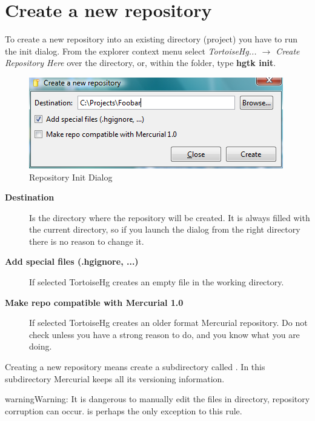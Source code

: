 \documentclass[letterpaper,10pt,english]{manual}
\begin{document}
\section{Create a new repository}
\hypertarget{module-init.dialog}{}
To create a new repository into an existing directory (project) you
have to run the init dialog. From the explorer context menu select
\emph{TortoiseHg... \(\rightarrow\) Create Repository Here} over the directory, or, within
the folder, type \textbf{hgtk init}.
\begin{figure}[htbp]
\centering

\includegraphics{init.png}
\caption{Repository Init Dialog}\end{figure}
\begin{description}
\item[\textbf{Destination}]
Is the directory where the repository will be created. It is
always filled with the current directory, so if you launch the
dialog from the right directory there is no reason to change it.

\item[\textbf{Add special files (.hgignore, ...)}]
If selected TortoiseHg creates an empty  file
in the working directory.

\item[\textbf{Make repo compatible with Mercurial 1.0}]
If selected TortoiseHg creates an older format Mercurial repository.
Do not check unless you have a strong reason to do, and you know
what you are doing.

\end{description}

Creating a new repository means create a subdirectory called .
In this subdirectory Mercurial keeps all its versioning information.

\begin{notice}{warning}{Warning:}
It is dangerous to manually edit the files in  directory,
repository corruption can occur.   is perhaps the
only exception to this rule.
\end{notice}
\end{document}
